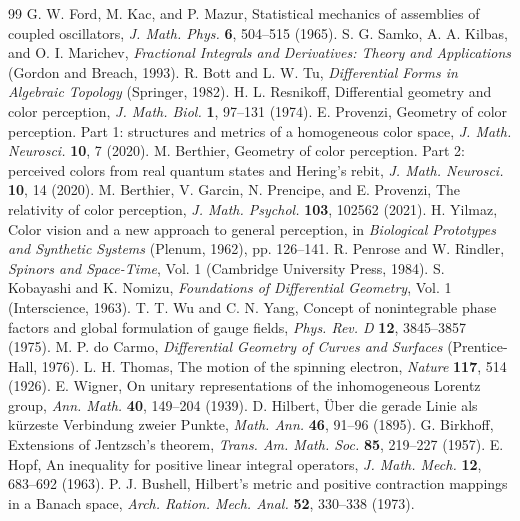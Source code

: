 \documentclass[11pt]{article}
\theoremstyle{boldplain}
\theoremstyle{boldupright}
\begin{document}
\begin{thebibliography}{99}
 G. W. Ford, M. Kac, and P. Mazur, Statistical mechanics of assemblies of coupled oscillators, \emph{J. Math. Phys.} \textbf{6}, 504--515 (1965).
 S. G. Samko, A. A. Kilbas, and O. I. Marichev, \emph{Fractional Integrals and Derivatives: Theory and Applications} (Gordon and Breach, 1993).
 R. Bott and L. W. Tu, \emph{Differential Forms in Algebraic Topology} (Springer, 1982).
 H. L. Resnikoff, Differential geometry and color perception, \emph{J. Math. Biol.} \textbf{1}, 97--131 (1974).
 E. Provenzi, Geometry of color perception. Part 1: structures and metrics of a homogeneous color space, \emph{J. Math. Neurosci.} \textbf{10}, 7 (2020).
 M. Berthier, Geometry of color perception. Part 2: perceived colors from real quantum states and Hering's rebit, \emph{J. Math. Neurosci.} \textbf{10}, 14 (2020).
 M. Berthier, V. Garcin, N. Prencipe, and E. Provenzi, The relativity of color perception, \emph{J. Math. Psychol.} \textbf{103}, 102562 (2021).
 H. Yilmaz, Color vision and a new approach to general perception, in \emph{Biological Prototypes and Synthetic Systems} (Plenum, 1962), pp. 126--141.
 R. Penrose and W. Rindler, \emph{Spinors and Space-Time}, Vol. 1 (Cambridge University Press, 1984).
 S. Kobayashi and K. Nomizu, \emph{Foundations of Differential Geometry}, Vol. 1 (Interscience, 1963).
 T. T. Wu and C. N. Yang, Concept of nonintegrable phase factors and global formulation of gauge fields, \emph{Phys. Rev. D} \textbf{12}, 3845--3857 (1975).
 M. P. do Carmo, \emph{Differential Geometry of Curves and Surfaces} (Prentice-Hall, 1976).
 L. H. Thomas, The motion of the spinning electron, \emph{Nature} \textbf{117}, 514 (1926).
 E. Wigner, On unitary representations of the inhomogeneous Lorentz group, \emph{Ann. Math.} \textbf{40}, 149--204 (1939).
 D. Hilbert, \"Uber die gerade Linie als k\"urzeste Verbindung zweier Punkte, \emph{Math. Ann.} \textbf{46}, 91--96 (1895).
 G. Birkhoff, Extensions of Jentzsch's theorem, \emph{Trans. Am. Math. Soc.} \textbf{85}, 219--227 (1957).
 E. Hopf, An inequality for positive linear integral operators, \emph{J. Math. Mech.} \textbf{12}, 683--692 (1963).
 P. J. Bushell, Hilbert's metric and positive contraction mappings in a Banach space, \emph{Arch. Ration. Mech. Anal.} \textbf{52}, 330--338 (1973).

\end{thebibliography}
\end{document}
